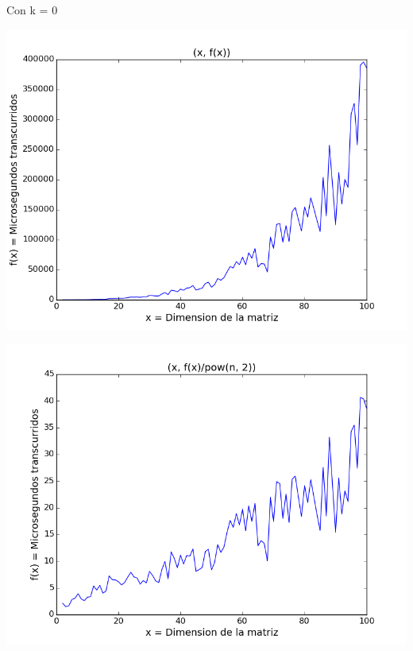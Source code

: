 \vspace{200mm}

Con k = 0

\begin{center}
\includegraphics[scale=0.54]{images/0potenciafuncion}
\end{center}


\begin{center}
\includegraphics[scale=0.54]{images/0potenciasobrecuadrado}
\end{center}


